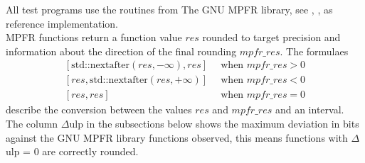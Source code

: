 \documentclass[10pt,a4paper,final,oneside]{article}
\numberwithin{equation}{subsection}
\begin{document}
All test programs use the routines from The GNU MPFR library, see
\cite{mpfr}, \cite{Fousse:2007:MMB:1236463.1236468}, as reference
implementation.\\[10pt]
MPFR functions return a function value $res$ rounded to target precision
and information about the direction of the final rounding $mpfr\_res$.
The formulaes
\[
    \begin{aligned}
        \left[\text{std::nextafter}(res, -\infty), res\right] &
            \, \text{ when } mpfr\_res > 0 \\
        \left[res, \text{std::nextafter}(res, +\infty)\right] &
            \, \text{ when } mpfr\_res < 0 \\
        \left[res, res\right] &
            \, \text{ when } mpfr\_res = 0
    \end{aligned}
\]
describe the conversion between the values $res$ and $mpfr\_res$
and an interval.\\[10pt]
The column $\Delta$ulp in the subsections below shows the maximum
deviation in bits against the GNU MPFR library functions observed,
this means functions with $\Delta$ulp = 0 are correctly rounded.
%
%
\end{document}
